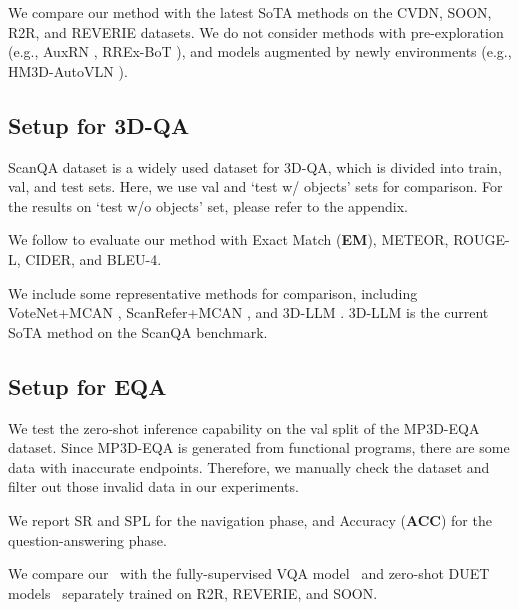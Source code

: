  We compare our method with the latest SoTA methods on the CVDN, SOON, R2R, and REVERIE datasets. We do not consider methods with pre-exploration (e.g., AuxRN \cite{zhu2020vision}, RREx-BoT \cite{sigurdsson2023rrex}), and models augmented by newly environments (e.g., HM3D-AutoVLN \cite{Chen_2022_HM3D_AutoVLN}).

\subsection{Setup for 3D-QA} 
\label{sec:exp_3dqa}
ScanQA dataset \cite{azuma2022scanqa} is a widely used dataset for 3D-QA, which is divided into train, val, and test sets. Here, we use val and `test w/ objects' sets for comparison. 
For the results on `test w/o objects' set, please refer to the appendix.

 We follow \cite{hong20233dllm} to evaluate our method with Exact Match (\textbf{EM}), METEOR, ROUGE-L, CIDER, and BLEU-4. 

 We include some representative methods for comparison, including VoteNet+MCAN \cite{yu2019mcan}, ScanRefer+MCAN \cite{yu2019mcan}, and 3D-LLM \cite{hong20233dllm}. 3D-LLM is the current SoTA method on the ScanQA benchmark.

\subsection{Setup for EQA} 
\label{sec:exp_eqa}

We test the zero-shot inference capability on the val split of the MP3D-EQA~\cite{wijmans2019embodied} dataset.
Since MP3D-EQA is generated from functional programs, there are some data with inaccurate endpoints. Therefore, we manually check the dataset and filter out those invalid data in our experiments.



 We report SR and SPL for the navigation phase, and Accuracy (\textbf{ACC}) for the question-answering phase.

We compare our \modelname~with the fully-supervised VQA model~\cite{embodiedqa} and zero-shot DUET models~\cite{Chen_2022_CVPR} separately trained on R2R, REVERIE, and SOON.











